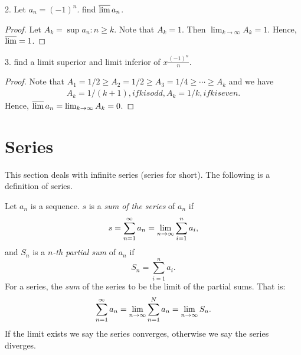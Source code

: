 2. Let $a_n = (-1)^n$. find $\varlimsup a_n$.
\begin{proof}
  Let $A_k = \sup{a_n: n \ge k}$. Note that $A_k = 1$. Then $\lim_{k \to \infty}
    A_k = 1$. Hence, $\varlimsup = 1$.
\end{proof}

3. find a limit superior and limit inferior of $x\frac{(-1)^n}{n}$.
\begin{proof}
  Note that $A_1 = 1/2 \ge A_2 = 1/2 \ge A_3 = 1/4 \ge \cdots \ge A_k$ and we
  have
  \begin{equation}
    \begin{split}
      A_k = 1/(k + 1), if k is odd,
      A_k = 1/k, if k is even.
    \end{split}
  \end{equation}
  Hence, $\varlimsup a_n = \lim_{k \to \infty} A_k = 0$.
\end{proof}

\newpage
\section{Series}

This section deals with infinite series (series for short). The following is a
definition of series.
\begin{definition}
  Let $a_n$ is a sequence. $s$ is a \emph{sum of the series} of $a_n$ if
  \begin{equation}
    s = \sum_{n=1}^{\infty} a_n = \lim_{n \to \infty}\sum_{i = 1}^{n} a_i,
  \end{equation}
  and $S_n$ is a \emph{$n$-th partial sum} of $a_n$ if
  \begin{equation}
    S_n = \sum_{i = 1}^{n} a_i.
  \end{equation}
  For a series, the \emph{sum} of the series to be the limit of the partial
  sums. That is:
  \begin{equation}
    \sum_{n=1}^{\infty} a_n = \lim_{n \to \infty}\sum_{n = 1}^{N}
    a_n = \lim_{n \to \infty} S_n.
  \end{equation}
  If the limit exists we say the series converges, otherwise we say the series
  diverges.
  \label{def:ser}
\end{definition}


